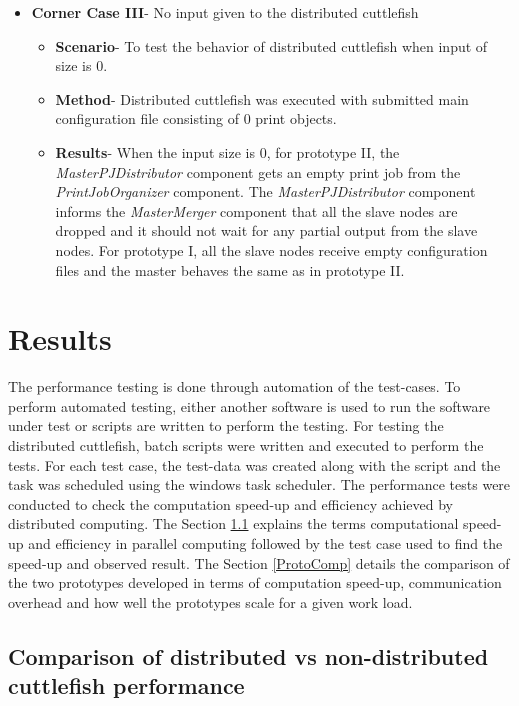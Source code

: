 \begin{enumerate}
\begin{itemize}
\item{\textbf{Corner Case III}- No input given to the distributed cuttlefish}
\begin{itemize}
\item{\textbf{Scenario}}- To test the behavior of distributed cuttlefish when input of size is 0.
\item{\textbf{Method}}- Distributed cuttlefish was executed with submitted main configuration file consisting of 0 print objects.
\item{\textbf{Results}}- When the input size is 0, for prototype II, the \textit{MasterPJDistributor} component gets an empty print job from the \textit{PrintJobOrganizer} component. The \textit{MasterPJDistributor} component informs the \textit{MasterMerger} component that all the slave nodes are dropped and it should not wait for any partial output from the slave nodes. For prototype I, all the slave nodes receive empty configuration files and the master behaves the same as in prototype II. 
\end{itemize}
\end{itemize}
\end{enumerate}

 
\section{Results} \label{PerformanceTests}

The performance testing is done through automation of the test-cases. To perform automated testing, either another software is used to run the software under test or scripts are written to perform the testing. For testing the distributed cuttlefish, batch scripts were written and executed to perform the tests. For each test case, the test-data was created along with the script and the task was scheduled using the windows task scheduler. The performance tests were conducted to check the computation speed-up and efficiency achieved by distributed computing. The Section \ref{DistvsNonDist} explains the terms computational speed-up and efficiency in parallel computing followed by the test case used to find the speed-up and observed result. The Section \ref{ProtoComp} details the comparison of the two prototypes developed in terms of computation speed-up, communication overhead and how well the prototypes scale for a given work load.

\subsection{Comparison of distributed vs non-distributed cuttlefish performance} \label{DistvsNonDist}

